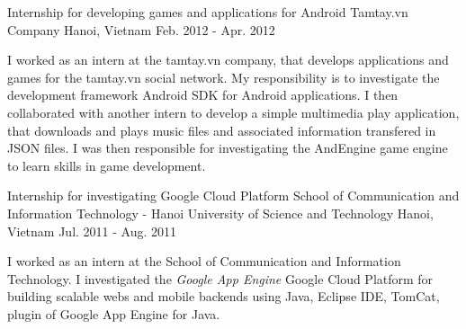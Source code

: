 \cventry
{Internship for developing games and applications for Android} %
{Tamtay.vn Company} %
{Hanoi, Vietnam} %
{Feb. 2012 - Apr. 2012} %
{ %
	\begin{cvitems}
		\item {I worked as an intern at the tamtay.vn company, that develops applications and games for the tamtay.vn social network. My responsibility is to investigate the development framework Android SDK for Android applications. I then collaborated with another intern to develop a simple multimedia play application, that downloads and plays music files and associated information transfered in JSON files. I was then responsible for investigating the AndEngine game engine to learn skills in game development.}		
	\end{cvitems}
}

\cventry
{Internship for investigating Google Cloud Platform} %
{School of Communication and Information Technology - Hanoi University of Science and Technology} %
{Hanoi, Vietnam} %
{Jul. 2011 - Aug. 2011} %
{ %
	\begin{cvitems}
		\item {I worked as an intern at the School of Communication and Information Technology. I investigated the \textit{Google App Engine} Google Cloud Platform for building scalable webs and mobile backends using Java, Eclipse IDE, TomCat, plugin of Google App Engine for Java.}		
	\end{cvitems}
}